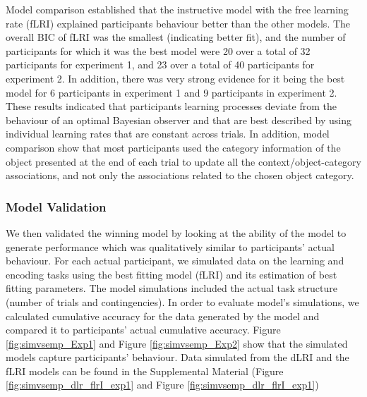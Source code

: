 \documentclass[a4paper,12pt]{article}
\begin{document}
Model comparison established that the instructive model with the free learning rate (fLRI) explained participants behaviour better than the other models. The overall BIC of fLRI was the smallest (indicating better fit), and the number of participants for which it was the best model were 20 over a total of 32 participants for experiment 1, and 23 over a total of 40 participants for experiment 2. In addition, there was very strong evidence for it being the best model for 6 participants in experiment 1 and 9 participants in experiment 2. %
These results indicated that participants learning processes deviate from the behaviour of an optimal Bayesian observer and that are best described by using individual learning rates that are constant across trials. In addition, model comparison show that most participants used the category information of the object presented at the end of each trial to update all the context/object-category associations, and not only the associations related to the chosen object category.

\subsubsection{Model Validation}
We then validated the winning model by looking at the ability of the model to generate performance which was qualitatively similar to participants' actual behaviour. For each actual participant, we simulated data on the learning and encoding tasks using the best fitting model (fLRI) and its estimation of best fitting parameters. The model simulations included the actual task structure (number of trials and contingencies). In order to evaluate model's simulations, we calculated cumulative accuracy for the data generated by the model and compared it to participants' actual cumulative accuracy. Figure \ref{fig:simvsemp_Exp1} and Figure \ref{fig:simvsemp_Exp2} show that the simulated models capture participants' behaviour. Data simulated from the dLRI and the fLRI models can be found in the Supplemental Material (Figure \ref{fig:simvsemp_dlr_flrI_exp1} and Figure \ref{fig:simvsemp_dlr_flrI_exp1})
\end{document}
